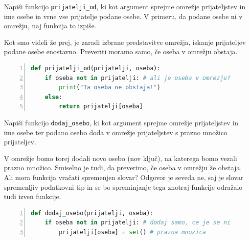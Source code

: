 \begin{zgled}
Napiši funkcijo \texttt{prijatelji\_od}, ki kot argument sprejme omrežje prijateljstev in ime osebe in vrne vse prijatelje podane osebe. V primeru, da podane osebe ni v omrežju, naj funkcija to izpiše.
\end{zgled}
\begin{resitev}
Kot smo videli že prej, je zaradi izbrane predstavitve omrežja, iskanje prijateljev podane osebe enostavno. Preveriti moramo samo, če oseba v omrežju obstaja.
\begin{lstlisting}[language=Python,numbers=left]
def prijatelji_od(prijatelji, oseba):
    if oseba not in prijatelji: # ali je oseba v omrezju?
        print("Ta oseba ne obstaja!")
    else:
        return prijatelji[oseba]
\end{lstlisting}
\end{resitev}

\begin{zgled}
Napiši funkcijo \texttt{dodaj\_osebo}, ki kot argument sprejme omrežje prijateljstev in ime osebe ter podano osebo doda v omrežje prijateljstev s prazno množico prijateljev.
\end{zgled}
\begin{resitev}
V omrežje bomo torej dodali novo osebo (nov ključ), na katerega bomo vezali prazno množico. Smiselno je tudi, da preverimo, če oseba v omrežju že obstaja. Ali mora funkcija vračati spremenjen slovar? Odgovor je seveda ne, saj je slovar spremenljiv podatkovni tip in se bo spreminjanje tega znotraj funkcije odražalo tudi izven funkcije.
\begin{lstlisting}[language=Python,numbers=left]
def dodaj_osebo(prijatelji, oseba):
    if oseba not in prijatelji: # dodaj samo, ce je se ni
        prijatelji[oseba] = set() # prazna mnozica
\end{lstlisting}
\end{resitev}

